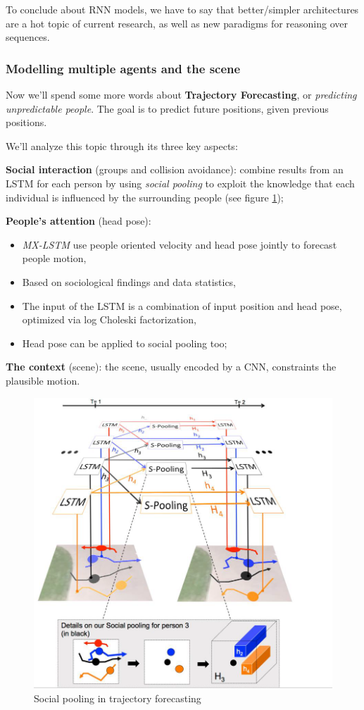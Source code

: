To conclude about RNN models, we have to say that better/simpler architectures are a hot topic of current research, as well as new paradigms for reasoning over sequences.


\subsubsection{Modelling multiple agents and the scene}\label{sec:seq-multiple-agents}

Now we'll spend some more words about \textbf{Trajectory Forecasting}, or \textit{predicting unpredictable people}. The goal is to predict future positions, given previous positions.

We'll analyze this topic through its three key aspects:
\begin{myitem}
    \item \textbf{Social interaction} (groups and collision avoidance): combine results from an LSTM for each person by using \textit{social pooling} to exploit the knowledge that each individual is influenced by the surrounding people (see figure \ref{fig:seq-trajectory-1});
    \item \textbf{People's attention} (head pose):
    \begin{itemize}
        \item \textit{MX-LSTM} use people oriented velocity and head pose jointly to forecast people motion,
        \item Based on sociological findings and data statistics,
        \item The input of the LSTM is a combination of input position and head pose, optimized via log Choleski factorization,
        \item Head pose can be applied to social pooling too;
    \end{itemize}
    \item \textbf{The context} (scene): the scene, usually encoded by a CNN, constraints the plausible motion.
\end{myitem}

\begin{figure}[H]
    \centering
    \includegraphics[width=.4\linewidth]{images/seq-trajectory-1}
    \caption[Social pooling in trajectory forecasting]{Social pooling in trajectory forecasting}
    \label{fig:seq-trajectory-1}
\end{figure}


